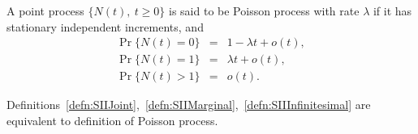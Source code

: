 \documentclass[a4paper,10pt,english]{article}
\begin{document}
\begin{defn}\label{defn:SIIInfinitesimal} A point process $\{N(t),~t\geqslant 0\}$ is said to be Poisson process with rate $\lambda$ if it has stationary independent increments, and 
\begin{eqnarray*}\label{eqn1}
\Pr\{N(t)=0\} &=& 1-\lambda t + o(t), \\
  \Pr\{N(t)=1\} &=& \lambda t + o(t), \\
  \Pr\{N(t)>1\} &=& o(t).
\end{eqnarray*}
\end{defn}

\begin{thm} Definitions~\ref{defn:SIIJoint},~\ref{defn:SIIMarginal},~\ref{defn:SIIInfinitesimal} are equivalent to definition of Poisson process.
\end{thm}
\end{document}
